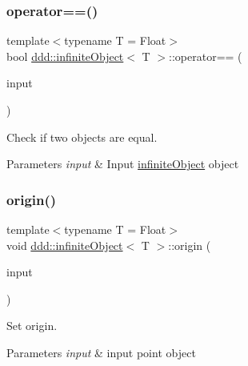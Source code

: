 \subsubsection{\texorpdfstring{operator==()}{operator==()}}
{\footnotesize\ttfamily template$<$typename T = Float$>$ \\
bool \hyperlink{classddd_1_1infinite_object}{ddd\+::infinite\+Object}$<$ T $>$\+::operator== (\begin{DoxyParamCaption}\item[{const \hyperlink{classddd_1_1infinite_object}{infinite\+Object}$<$ T $>$ \&}]{input }\end{DoxyParamCaption})\hspace{0.3cm}{\ttfamily [inline]}}



Check if two objects are equal. 


\begin{DoxyParams}{Parameters}
{\em input} & Input \hyperlink{classddd_1_1infinite_object}{infinite\+Object} object \\
\hline
\end{DoxyParams}
\mbox{\label{classddd_1_1infinite_object_a82ecd5fc09ecfe5b1fe9a2609dd1465e}} 
\subsubsection{\texorpdfstring{origin()}{origin()}}
{\footnotesize\ttfamily template$<$typename T = Float$>$ \\
void \hyperlink{classddd_1_1infinite_object}{ddd\+::infinite\+Object}$<$ T $>$\+::origin (\begin{DoxyParamCaption}\item[{const \hyperlink{classddd_1_1point}{point}$<$ T $>$ \&}]{input }\end{DoxyParamCaption})\hspace{0.3cm}{\ttfamily [inline]}}



Set origin. 


\begin{DoxyParams}{Parameters}
{\em input} & input point object \\
\hline
\end{DoxyParams}
\mbox{\label{classddd_1_1infinite_object_a72649daa44060efdbef986ab9d90f3f6}} 
